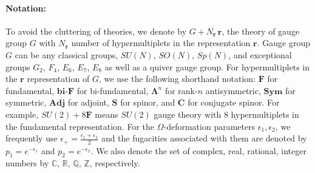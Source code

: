 \paragraph{Notation:} To avoid the cluttering of theories, we denote by $G+N_{\mathbf{r}}\,\mathbf{r}$, the theory of gauge group $G$ with $N_\mathbf{r}$ number of hypermultiplets in the representation $\mathbf{r}$. Gauge group $G$ can be any classical groups, $SU(N)$, $SO(N)$, $Sp(N)$, and exceptional groups $G_2$, $F_4$, $E_6$, $E_7$, $E_8$ as well as a quiver gauge group. For hypermultiplets in the $\mathbf{r}$ representation of $G$, we use the following shorthand notation: $\mathbf{F}$ for fundamental, $\mathbf{bi\text{-}F}$ for bi-fundamental, $\mathbf{\Lambda}^n$ for rank-$n$ antisymmetric, $\mathbf{Sym}$ for symmetric, $\mathbf{Adj}$ for adjoint, $\mathbf{S}$ for spinor, and $\mathbf{C}$ for conjugate spinor. For example, $SU(2)+8\mathbf{F}$ means $SU(2)$ gauge theory with 8 hypermultiplets in the fundamental representation. For the $\Omega$-deformation parameters $\epsilon_{1}, \epsilon_{2}$, we frequently use $\epsilon_+=\frac{\epsilon_1+\epsilon_2}{2}$ and the fugacities associated with them are denoted by $p_1 =e^{-\epsilon_1}$ and $p_2= e^{-\epsilon_2}$. We also denote the set of complex, real, rational, integer numbers by $\mathbb{C}$, $\mathbb{R}$, $\mathbb{Q}$, $\mathbb{Z}$, respectively. 
